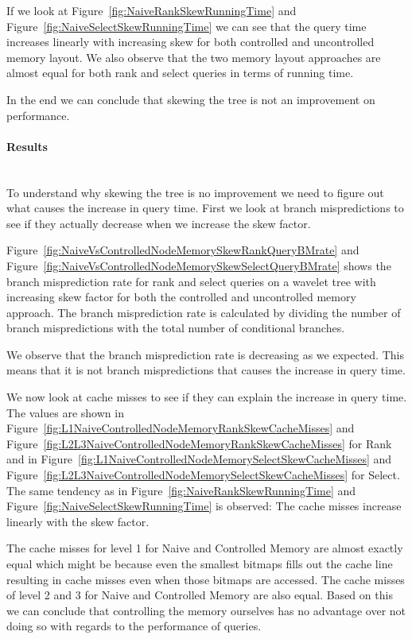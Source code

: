If we look at Figure~\ref{fig:NaiveRankSkewRunningTime} and Figure~\ref{fig:NaiveSelectSkewRunningTime} we can see that the query time increases linearly with increasing skew for both controlled and uncontrolled memory layout. We also observe that the two memory layout approaches are almost equal for both rank and select queries in terms of running time.

In the end we can conclude that skewing the tree is not an improvement on performance.

\paragraph{Results}~\\
To understand why skewing the tree is no improvement we need to figure out what causes the increase in query time. 
First we look at branch mispredictions to see if they actually decrease when we increase the skew factor.%

 
Figure~\ref{fig:NaiveVsControlledNodeMemorySkewRankQueryBMrate} and Figure~\ref{fig:NaiveVsControlledNodeMemorySkewSelectQueryBMrate} shows the branch misprediction rate for rank and select queries on a wavelet tree with increasing skew factor for both the controlled and uncontrolled memory approach. 
The branch misprediction rate is calculated by dividing the number of branch mispredictions with the total number of conditional branches.

We observe that the branch misprediction rate is decreasing as we expected. 
This means that it is not branch mispredictions that causes the increase in query time. 

We now look at cache misses to see if they can explain the increase in query time. 
The values are shown in Figure~\ref{fig:L1NaiveControlledNodeMemoryRankSkewCacheMisses} and Figure~\ref{fig:L2L3NaiveControlledNodeMemoryRankSkewCacheMisses} for Rank and in Figure~\ref{fig:L1NaiveControlledNodeMemorySelectSkewCacheMisses} and Figure~\ref{fig:L2L3NaiveControlledNodeMemorySelectSkewCacheMisses} for Select.
The same tendency as in Figure~\ref{fig:NaiveRankSkewRunningTime} and Figure~\ref{fig:NaiveSelectSkewRunningTime} is observed: 
The cache misses increase linearly with the skew factor.

The cache misses for level 1 for Naive and Controlled Memory are almost exactly equal which might be because even the smallest bitmaps fills out the cache line resulting in cache misses even when those bitmaps are accessed. 
The cache misses of level 2 and 3 for Naive and Controlled Memory are also equal. 
Based on this we can conclude that controlling the memory ourselves has no advantage over not doing so with regards to the performance of queries.

